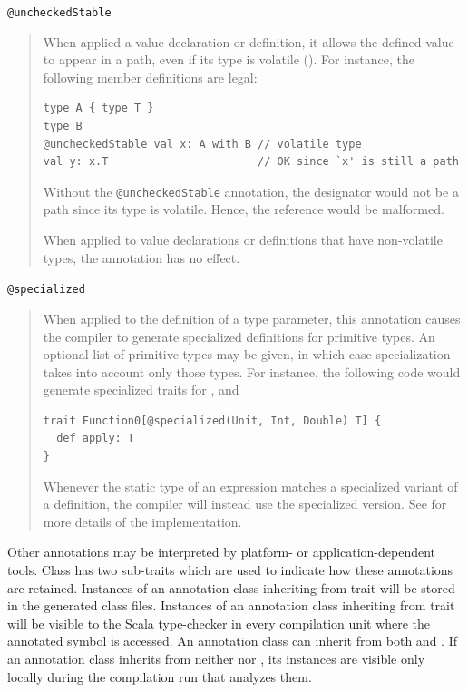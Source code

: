 \lstinline^@uncheckedStable^
\begin{quote}
When applied a value declaration or definition, it allows the defined
value to appear in a path, even if its type is volatile ().
For instance, the following member definitions are legal:
\begin{lstlisting}
type A { type T }
type B 
@uncheckedStable val x: A with B // volatile type 
val y: x.T                       // OK since `x' is still a path
\end{lstlisting}
Without the \lstinline^@uncheckedStable^ annotation, the designator 
would not be a path since its type  is volatile. Hence,
the reference  would be malformed. 

When applied to value declarations or definitions that have non-volatile types, 
the annotation has no effect. 
\end{quote}

\lstinline^@specialized^
\begin{quote}
When applied to the definition of a type parameter, this annotation causes the compiler
to generate specialized definitions for primitive types. An optional list of primitive
types may be given, in which case specialization takes into account only those types.
For instance, the following code would generate specialized traits for \lstinline@Unit@, 
\lstinline@Int@ and \lstinline@Double@
\begin{lstlisting}
trait Function0[@specialized(Unit, Int, Double) T] {
  def apply: T
}
\end{lstlisting}
Whenever the static type of an expression matches a specialized variant of a definition,
the compiler will instead use the specialized version. See \cite{spec-sid} for more details
of the implementation.
\end{quote}


Other annotations may be interpreted by platform- or
application-dependent tools. Class  has two
sub-traits which are used to indicate how these annotations are
retained. Instances of an annotation class inheriting from trait
 will be stored in the generated class
files. Instances of an annotation class inheriting from trait
 will be visible to the Scala type-checker
in every compilation unit where the annotated symbol is accessed. An
annotation class can inherit from both 
and . If an annotation class inherits from
neither  nor
, its instances are visible only locally
during the compilation run that analyzes them.

